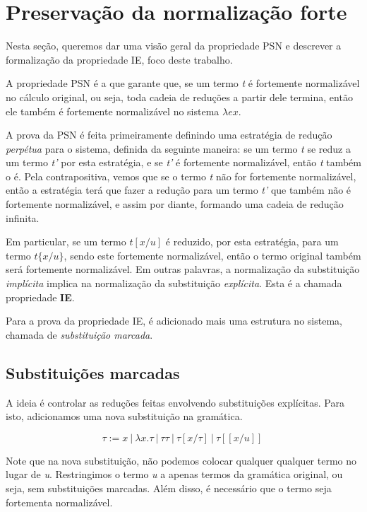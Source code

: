 


\section{Preservação da normalização forte}
\label{sec:psn}

Nesta seção, queremos dar uma visão geral da propriedade PSN e descrever a
formalização da propriedade IE, foco deste trabalho. 

A propriedade PSN é a que garante que, se um termo \emph{t} é fortemente
normalizável no cálculo original, ou seja, toda cadeia de reduções a partir dele
termina, então ele também é fortemente normalizável no sistema $\lambda ex$.

A prova da PSN é feita primeiramente definindo uma estratégia de redução
\emph{perpétua} para o sistema, definida da seguinte maneira: se um termo
\emph{t} se reduz a um termo \emph{t'} por esta estratégia, e se \emph{t'} é
fortemente normalizável, então \emph{t} também o é. Pela contrapositiva, vemos
que se o termo \emph{t} não for fortemente normalizável, então a estratégia terá
que fazer a redução para um termo \emph{t'} que também não é fortemente
normalizável, e assim por diante, formando uma cadeia de redução infinita.

Em particular, se um termo $t[x/u]$ é reduzido, por esta estratégia, para um
termo $t\{x/u\}$, sendo este fortemente normalizável, então o termo original
também será fortemente normalizável. Em outras palavras, a normalização da
substituição \emph{implícita} implica na normalização da substituição
\emph{explícita}. Esta é a chamada propriedade \textbf{IE}.

Para a prova da propriedade IE, é adicionado mais uma estrutura no sistema,
chamada de \emph{substituição marcada}.

\subsection{Substituições marcadas}
\label{sub:subst_marc}

A ideia é controlar as reduções feitas envolvendo substituições explícitas. Para
isto, adicionamos uma nova substituição na gramática.

\[ \tau := x\ |\ \lambda x.\tau\ |\ \tau \tau\ |\ \tau[x/\tau]\ |\
    \tau[[x/u]]\ \]

Note que na nova substituição, não podemos colocar qualquer qualquer termo no
lugar de \textit{u}. Restringimos o termo \textit{u} a apenas termos da gramática
original, ou seja, sem substituições marcadas. Além disso, é necessário que o
termo seja fortementa normalizável.

